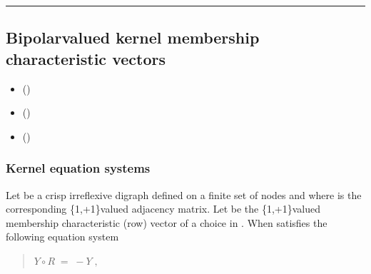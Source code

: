\documentclass[a4paper,12pt,english]{sphinxhowto}
\begin{document}
\bigskip\hrule\bigskip



\subsection{Bipolar\sphinxhyphen{}valued kernel membership characteristic vectors}
\label{\detokenize{pearls:bipolar-valued-kernel-membership-characteristic-vectors}}\label{\detokenize{pearls:bipolar-valued-kernels-tutorial-label}}
\begin{sphinxcontents}
\begin{itemize}
\item {} 
\sphinxAtStartPar
{}\label{\detokenize{pearls:id203}}{\hyperref[\detokenize{pearls:kernel-equation-systems}]{}} ()

\item {} 
\sphinxAtStartPar
{}\label{\detokenize{pearls:id204}}{\hyperref[\detokenize{pearls:solving-bipolar-valued-kernel-equation-systems}]{}} ()

\item {} 
\sphinxAtStartPar
{}\label{\detokenize{pearls:id205}}{\hyperref[\detokenize{pearls:historical-notes}]{}} ()

\end{itemize}
\end{sphinxcontents}


\subsubsection{Kernel equation systems}
\label{\detokenize{pearls:kernel-equation-systems}}
\sphinxAtStartPar
Let  be a crisp irreflexive digraph defined on a finite set  of nodes and where  is the corresponding \{\sphinxhyphen{}1,+1\}\sphinxhyphen{}valued adjacency matrix. Let  be the \{\sphinxhyphen{}1,+1\}\sphinxhyphen{}valued membership characteristic (row) vector of a choice in . When  satisfies the following equation system
\begin{quote}

\sphinxAtStartPar
\(Y \circ R \; = \; -Y\;,\)
\end{quote}
\end{document}

